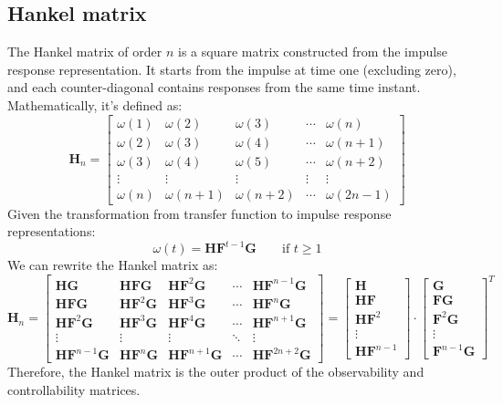 \subsection{Hankel matrix}
The Hankel matrix of order $n$ is a square matrix constructed from the impulse response representation.
It starts from the impulse at time one (excluding zero), and each counter-diagonal contains responses from the same time instant. 
Mathematically, it's defined as:
\[\mathbf{H}_n=\begin{bmatrix} \omega(1) & \omega(2) & \omega(3) & \cdots & \omega(n) \\ \omega(2) & \omega(3) & \omega(4) & \cdots & \omega(n+1) \\ \omega(3) & \omega(4) & \omega(5) & \cdots & \omega(n+2) \\ \vdots & \vdots  & \vdots  & \vdots  & \vdots  \\ \omega(n) & \omega(n+1) & \omega(n+2) & \cdots & \omega(2n-1) \end{bmatrix}\]
Given the transformation from transfer function to impulse response representations:
\[\omega(t)=\mathbf{HF}^{t-1}\mathbf{G} \qquad \text{if } t \geq 1\]
We can rewrite the Hankel matrix as:
\[\mathbf{H}_n=\begin{bmatrix} \mathbf{HG} & \mathbf{HFG} & \mathbf{HF}^2\mathbf{G}  & \cdots & \mathbf{HF}^{n-1}\mathbf{G} \\ \mathbf{HFG} & \mathbf{HF}^2\mathbf{G} & \mathbf{HF}^3\mathbf{G}  & \cdots & \mathbf{HF}^{n}\mathbf{G} \\ \mathbf{HF}^2\mathbf{G} & \mathbf{HF}^3\mathbf{G} & \mathbf{HF}^4\mathbf{G}  & \cdots & \mathbf{HF}^{n+1}\mathbf{G} \\ \vdots & \vdots  & \vdots  & \ddots  & \vdots  \\ \mathbf{HF}^{n-1}\mathbf{G} & \mathbf{HF}^{n}\mathbf{G} & \mathbf{HF}^{n+1}\mathbf{G}  & \cdots & \mathbf{HF}^{2n+2}\mathbf{G} \end{bmatrix}=\begin{bmatrix} \mathbf{H} \\ \mathbf{HF} \\ \mathbf{HF}^2 \\ \vdots \\ \mathbf{HF}^{n-1} \end{bmatrix} \cdot \begin{bmatrix} \mathbf{G} \\ \mathbf{FG} \\ \mathbf{F}^2\mathbf{G} \\ \vdots \\ \mathbf{F}^{n-1}\mathbf{G} \end{bmatrix}^T\]
Therefore, the Hankel matrix is the outer product of the observability and controllability matrices. 